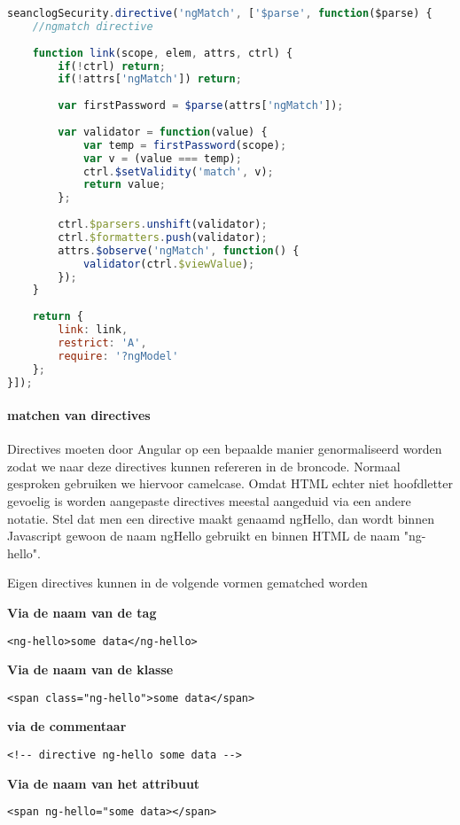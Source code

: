 \documentclass[a4paper,11pt]{article}
\begin{document}
\begin{lstlisting}[language=javascript]
seanclogSecurity.directive('ngMatch', ['$parse', function($parse) {
	//ngmatch directive
	
	function link(scope, elem, attrs, ctrl) {
		if(!ctrl) return;
		if(!attrs['ngMatch']) return;
		
		var firstPassword = $parse(attrs['ngMatch']);
		
		var validator = function(value) {
			var temp = firstPassword(scope);
			var v = (value === temp);
			ctrl.$setValidity('match', v);
			return value;
		};
		
		ctrl.$parsers.unshift(validator);
		ctrl.$formatters.push(validator);
		attrs.$observe('ngMatch', function() {
			validator(ctrl.$viewValue);
		});
	}
	
	return {
		link: link,
		restrict: 'A',
		require: '?ngModel'
	};
}]);
\end{lstlisting}
\paragraph{matchen van directives}
Directives moeten door Angular op een bepaalde manier genormaliseerd worden zodat we naar deze directives kunnen refereren in de broncode. Normaal gesproken gebruiken we hiervoor camelcase. Omdat HTML echter niet hoofdletter gevoelig is worden aangepaste directives meestal aangeduid via een andere notatie. Stel dat men een directive maakt genaamd ngHello, dan wordt binnen Javascript gewoon de naam ngHello gebruikt en binnen HTML de naam "ng-hello".

Eigen directives kunnen in de volgende vormen gematched worden \\
\begin{large}
\textbf{Via de naam van de tag}
\end{large}
\begin{lstlisting}
<ng-hello>some data</ng-hello>
\end{lstlisting}
\begin{large}
\textbf{Via de naam van de klasse}
\end{large}
\begin{lstlisting}
<span class="ng-hello">some data</span>
\end{lstlisting}
\begin{large}
\textbf{via de commentaar}
\end{large}
\begin{lstlisting}
<!-- directive ng-hello some data -->
\end{lstlisting}
\begin{large}
\textbf{Via de naam van het attribuut}
\end{large}
\begin{lstlisting}
<span ng-hello="some data></span>
\end{lstlisting}
\end{document}
